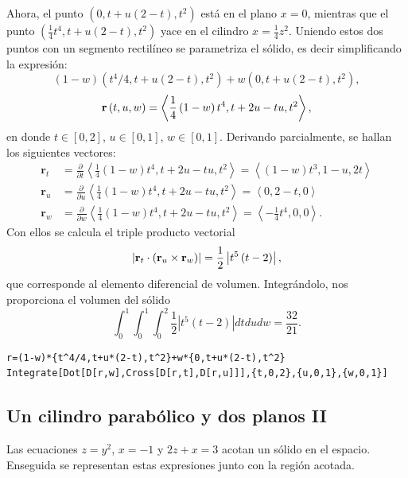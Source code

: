 Ahora, el punto $\left( 0,t+u\left( 2-t\right) ,t^2\right) $ está
en el plano $x=0$, mientras que el punto
$\left( \frac{1}{4}t^{4},t+u\left( 2-t\right) ,t^2\right) $ yace en el cilindro $x=\frac{1}{4}z^2$. Uniendo estos dos puntos con un segmento rectilíneo se parametriza el sólido, es decir simplificando la expresión:
\[\left( 1-w\right) \left (t^{4}/4,t+u(2-t),t^2\right) +w\left( 0,t+u(2-t) ,t^2\right),\]
\[{\bf r}\left( t,u,w\right) = \left\langle \frac{1}{4}\left(1-w\right) t^{4},t+2u-tu,t^2\right\rangle,\]
en donde $t\in [0,2]$, $u\in [0,1]$, $w\in [0,1]$.
Derivando parcialmente, se hallan los siguientes vectores:
\begin{align*}
\mathbf{r}_t &= \frac{\partial}{\partial t} \left\langle \frac{1}{4}(1 - w) t^4, t + 2u - tu, t^2 \right\rangle = \left\langle (1 - w) t^3, 1 - u, 2t \right\rangle \\
\mathbf{r}_u &= \frac{\partial}{\partial u} \left\langle \frac{1}{4}(1 - w) t^4, t + 2u - tu, t^2 \right\rangle = \left\langle 0, 2 - t, 0 \right\rangle \\
\mathbf{r}_w &= \frac{\partial}{\partial w} \left\langle \frac{1}{4}(1 - w) t^4, t + 2u - tu, t^2 \right\rangle = \left\langle -\frac{1}{4}t^4, 0, 0 \right\rangle.
\end{align*}
Con ellos se calcula el triple producto vectorial
\[\left| {\bf r}_{t}\cdot \left( {\bf r}_{u}\times {\bf r}_{w}\right) \right| = \frac{1}{2}\left| t^{5}\left( t-2\right) \right|,\]
que corresponde al elemento diferencial de volumen. Integrándolo, nos proporciona el volumen del sólido
\[\int_{0}^{1}\int_{0}^{1}\int_0^2\frac{1}{2}\left|t^{5}(t-2)\right|dtdudw= \frac{32}{21}.\]

\begin{tcolorbox}[title=\bf Instrucción en \verb"Mathematica"]\begin{Verbatim}[formatcom=\letraverbatim]
r=(1-w)*{t^4/4,t+u*(2-t),t^2}+w*{0,t+u*(2-t),t^2}
Integrate[Dot[D[r,w],Cross[D[r,t],D[r,u]]],{t,0,2},{u,0,1},{w,0,1}]
\end{Verbatim}
\end{tcolorbox}

\subsection{Un cilindro parabólico y dos planos II}

Las ecuaciones $z=y^2$, $x=-1$ y $2z+x=3$ acotan un sólido en el espacio. Enseguida se representan estas expresiones junto con la región acotada.

